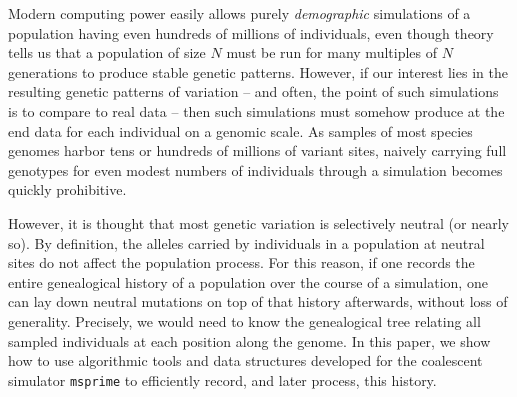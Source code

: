 \documentclass{article}
\newcommand{\msprime}{\texttt{msprime}}
\newcommand{\jk}[1]{{\em \color{red} #1}}
\begin{document}

Modern computing power easily allows purely \emph{demographic} simulations
of a population having even hundreds of millions of individuals,
even though theory tells us that a population of size $N$
must be run for many multiples of $N$ generations to produce stable genetic patterns.
However, if our interest lies in the resulting genetic patterns of variation
-- and often, the point of such simulations is to compare to real data --
then such simulations must somehow produce at the end data for each individual on a genomic scale.
As samples of most species genomes harbor tens or hundreds of millions of variant sites,
naively carrying full genotypes for even modest numbers of individuals through a simulation 
becomes quickly prohibitive.

However, it is thought that most genetic variation is selectively neutral (or nearly so).
By definition, the alleles carried by individuals in a population at neutral sites
do not affect the population process.
For this reason, if one records the entire genealogical history of a population over the course of a simulation,
one can lay down neutral mutations on top of that history afterwards,
without loss of generality.
Precisely, we would need to know the genealogical tree relating all sampled individuals
at each position along the genome.
In this paper, we show how to use algorithmic tools and data structures developed for the 
coalescent simulator \msprime{}
to efficiently record, and later process, this history.
\end{document}
